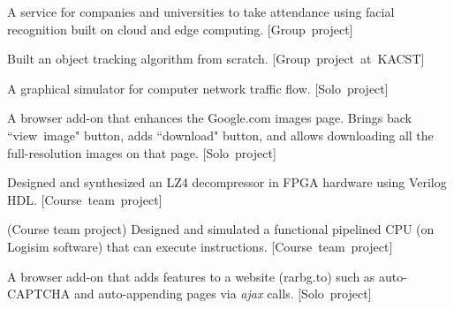 

A service for companies and universities to take attendance using facial recognition built on cloud and edge computing. \small{[Group~project]}\\

\divider

Built an object tracking algorithm from scratch.
\small{[Group~project~at~KACST]}\\

\divider

A graphical simulator for computer network traffic flow. \small{[Solo~project]}\\

\divider

A browser add-on that enhances the Google.com images page. Brings back ``view~image" button, adds ``download" button, and allows downloading all the full-resolution images on that page. \small{[Solo~project]}\\

\divider

Designed and synthesized an LZ4 decompressor in FPGA hardware using Verilog HDL. \small{[Course~team~project]}\\

\divider

(Course team project) Designed and simulated a functional pipelined CPU (on Logisim software) that can execute instructions. \small{[Course~team~project]}\\

\divider

A browser add-on that adds features to a website (rarbg.to) such as auto-CAPTCHA and auto-appending pages via \textit{ajax} calls. \small{[Solo~project]}\\

\cvproject{}